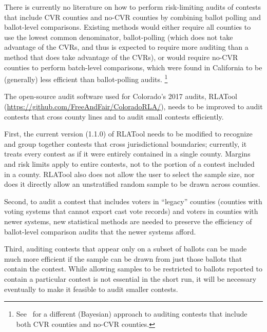 \documentclass[12pt]{article}
\begin{document}
There is currently no literature on how to perform risk-limiting audits 
of contests that include CVR counties and no-CVR counties by combining
ballot polling and ballot-level comparisons.
Existing methods would either require all counties to use the lowest
common denominator, ballot-polling (which does not take advantage of the CVRs,
and thus is expected to require more auditing than a method that does take
advantage of the CVRs), or would
require no-CVR counties to perform batch-level comparisons, which were found in
California to be (generally) less efficient than ballot-polling audits.%
\footnote{%
  See~\cite{Rivest-2018-bayesian-tabulation-audits}
  for a different (Bayesian) approach to auditing contests that include both CVR counties
  and no-CVR counties.
  }

The open-source audit software used for Colorado's 2017 audits,
RLATool (\url{https://github.com/FreeAndFair/ColoradoRLA/}),
needs to be improved to audit
contests that cross county lines and to audit small contests efficiently.

First, the current version (1.1.0) of RLATool
needs to be modified to recognize and group together contests that cross jurisdictional
boundaries; currently, it treats every contest as if it were entirely
contained in a single county.
Margins and risk limits apply to entire contests, not to the portion of a contest
included in a county.
RLATool also does not allow the user to select the sample size, nor does
it directly allow an unstratified random sample to be drawn across counties.

Second, to audit a contest that includes voters in ``legacy'' counties
(counties with voting systems that cannot export cast vote records)
and voters in counties with newer systems, new statistical methods are needed to
preserve the efficiency of ballot-level comparison audits that the newer systems
afford.

Third, auditing contests that appear only on a subset of ballots can
be made much more efficient if the sample can be drawn from just those ballots
that contain the contest.
While allowing samples to be restricted to ballots reported to contain a particular
contest is not essential in the short run, it will be necessary
eventually to make it feasible to audit smaller contests.
\end{document}

